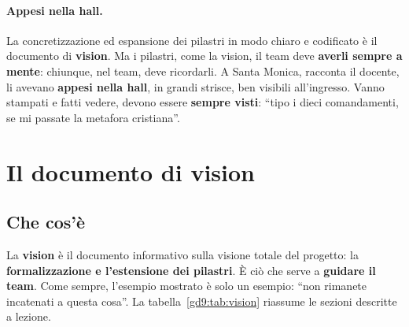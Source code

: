 \paragraph{Appesi nella hall.} La concretizzazione ed espansione dei pilastri
in modo chiaro e codificato è il documento di \textbf{vision}. Ma i pilastri,
come la vision, il team deve \textbf{averli sempre a mente}: chiunque, nel
team, deve ricordarli. A Santa Monica, racconta il docente, li avevano
\textbf{appesi nella hall}, in grandi strisce, ben visibili all'ingresso.
Vanno stampati e fatti vedere, devono essere \textbf{sempre visti}: ``tipo i
dieci comandamenti, se mi passate la metafora cristiana''.

\section{Il documento di vision}
\label{gd9:sec:vision}



\subsection{Che cos'è}

La \textbf{vision} è il documento informativo sulla visione totale del
progetto: la \textbf{formalizzazione e l'estensione dei pilastri}. È ciò che
serve a \textbf{guidare il team}. Come sempre, l'esempio mostrato è solo un
esempio: ``non rimanete incatenati a questa cosa''. La
tabella~\ref{gd9:tab:vision} riassume le sezioni descritte a lezione.

